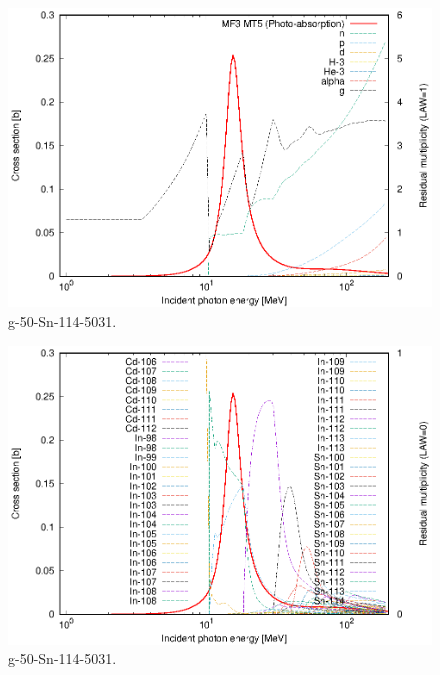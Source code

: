 \begin{figure}
 \includegraphics[width=\linewidth]{eps/g_50-Sn-114_5031.eps}
  \caption{g-50-Sn-114-5031.}
\end{figure}
\begin{figure}
 \includegraphics[width=\linewidth]{eps-law0/g_50-Sn-114_5031.eps}
 \caption{g-50-Sn-114-5031.}
\end{figure}
\newpage \clearpage

